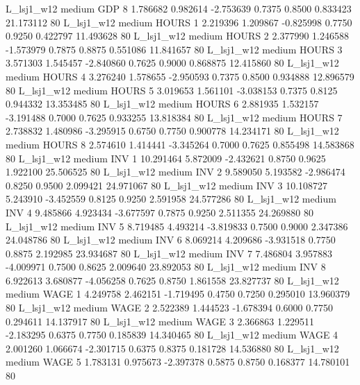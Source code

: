     L_lsj1_w12     medium      GDP                 8  1.786682 0.982614 -2.753639 0.7375 0.8500  0.833423   21.173112 80
    L_lsj1_w12     medium    HOURS                 1  2.219396 1.209867 -0.825998 0.7750 0.9250  0.422797   11.493628 80
    L_lsj1_w12     medium    HOURS                 2  2.377990 1.246588 -1.573979 0.7875 0.8875  0.551086   11.841657 80
    L_lsj1_w12     medium    HOURS                 3  3.571303 1.545457 -2.840860 0.7625 0.9000  0.868875   12.415860 80
    L_lsj1_w12     medium    HOURS                 4  3.276240 1.578655 -2.950593 0.7375 0.8500  0.934888   12.896579 80
    L_lsj1_w12     medium    HOURS                 5  3.019653 1.561101 -3.038153 0.7375 0.8125  0.944332   13.353485 80
    L_lsj1_w12     medium    HOURS                 6  2.881935 1.532157 -3.191488 0.7000 0.7625  0.933255   13.818384 80
    L_lsj1_w12     medium    HOURS                 7  2.738832 1.480986 -3.295915 0.6750 0.7750  0.900778   14.234171 80
    L_lsj1_w12     medium    HOURS                 8  2.574610 1.414441 -3.345264 0.7000 0.7625  0.855498   14.583868 80
    L_lsj1_w12     medium      INV                 1 10.291464 5.872009 -2.432621 0.8750 0.9625  1.922100   25.506525 80
    L_lsj1_w12     medium      INV                 2  9.589050 5.193582 -2.986474 0.8250 0.9500  2.099421   24.971067 80
    L_lsj1_w12     medium      INV                 3 10.108727 5.243910 -3.452559 0.8125 0.9250  2.591958   24.577286 80
    L_lsj1_w12     medium      INV                 4  9.485866 4.923434 -3.677597 0.7875 0.9250  2.511355   24.269880 80
    L_lsj1_w12     medium      INV                 5  8.719485 4.493214 -3.819833 0.7500 0.9000  2.347386   24.048786 80
    L_lsj1_w12     medium      INV                 6  8.069214 4.209686 -3.931518 0.7750 0.8875  2.192985   23.934687 80
    L_lsj1_w12     medium      INV                 7  7.486804 3.957883 -4.009971 0.7500 0.8625  2.009640   23.892053 80
    L_lsj1_w12     medium      INV                 8  6.922613 3.680877 -4.056258 0.7625 0.8750  1.861558   23.827737 80
    L_lsj1_w12     medium     WAGE                 1  4.249758 2.462151 -1.719495 0.4750 0.7250  0.295010   13.960379 80
    L_lsj1_w12     medium     WAGE                 2  2.522389 1.444523 -1.678394 0.6000 0.7750  0.294611   14.137917 80
    L_lsj1_w12     medium     WAGE                 3  2.366863 1.229511 -2.183295 0.6375 0.7750  0.185839   14.340465 80
    L_lsj1_w12     medium     WAGE                 4  2.001260 1.066674 -2.301715 0.6375 0.8375  0.181728   14.536880 80
    L_lsj1_w12     medium     WAGE                 5  1.783131 0.975673 -2.397378 0.5875 0.8750  0.168377   14.780101 80
